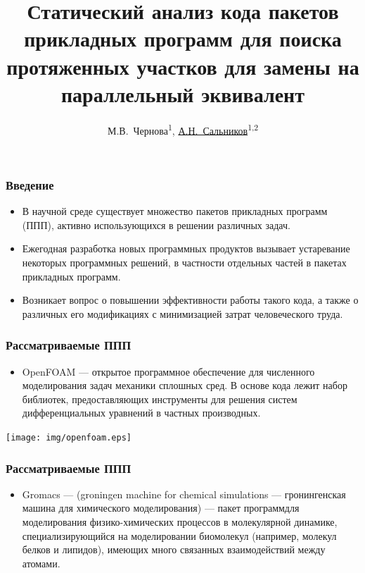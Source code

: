\documentclass{beamer}
\title[]%
{Статический анализ кода пакетов прикладных программ для поиска протяженных
        участков для замены на параллельный эквивалент}
\author[А.Н.~Сальников, М.В.~Чернова]
{
               М.В.~Чернова\textsuperscript{1},
    \underline{А.Н.~Сальников}\textsuperscript{1,2}
}
\institute{
             ВМК МГУ имени М.В. Ломоносова\textsuperscript{1},\newline
             ФИЦ ИУ РАН\textsuperscript{2},\newline
}
\date{}
\begin{document}

\begin{frame}
	\titlepage
\end{frame}




\begin{frame}
\frametitle{Введение}
\begin{itemize}
	\item В научной среде существует множество пакетов прикладных
программ (ППП), активно использующихся в решении различных
задач.
	\item Ежегодная разработка новых программных продуктов вызывает
устаревание некоторых программных решений, в частности
отдельных частей в пакетах прикладных программ.
	\item Возникает вопрос о повышении эффективности работы такого
кода, а также о различных его модификациях с минимизацией
затрат человеческого труда.
\end{itemize}
\end{frame}

\begin{frame}
\frametitle{Рассматриваемые ППП}
\begin{itemize}
	\item OpenFOAM  ---
	 открытое программное обеспечение для численного моделирования задач механики
	 сплошных сред. В основе кода лежит набор библиотек, предоставляющих инструменты
	 для решения систем дифференциальных уравнений в частных производных. 
\end{itemize}
\begin{center}
\texttt{[image: img/openfoam.eps]}
\end{center}
\end{frame}

\begin{frame}
\frametitle{Рассматриваемые ППП}
\begin{itemize}
	\item Gromacs  --- (groningen machine for chemical
simulations --- гронингенская машина для химического моделирования) --- пакет
 программдля моделирования физико-химических процессов в молекулярной динамике,
  специализирующийся на моделировании биомолекул (например, молекул белков и липидов),
   имеющих много связанных взаимодействий между атомами.
\end{itemize}
\end{frame}
\end{document}
